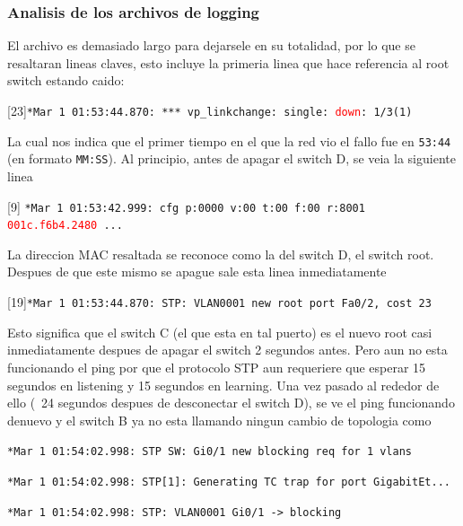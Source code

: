 \subsubsection*{Analisis de los archivos de logging}
El archivo es demasiado largo para dejarsele en su totalidad, por lo que se resaltaran
lineas claves, esto incluye la primeria linea que hace referencia al root switch
estando caido:
\begin{center}
  [23]\texttt{*Mar  1 01:53:44.870: *** vp\_linkchange: single: \textcolor{red}{down}: 1/3(1) }
\end{center}
La cual nos indica que el primer tiempo en el que la red vio el fallo fue en
\texttt{53:44} (en formato \texttt{MM:SS}). Al principio, antes de apagar el switch D,
se veia la siguiente linea
\begin{center}
  [9] \texttt{*Mar  1 01:53:42.999:     cfg p:0000 v:00 t:00 f:00 r:8001 \textcolor{red}{001c.f6b4.2480} ...}
\end{center}
La direccion MAC resaltada se reconoce como la del switch D, el switch root. Despues de
que este mismo se apague sale esta linea inmediatamente
\begin{center}
  [19]\texttt{*Mar  1 01:53:44.870: STP: VLAN0001 new root port Fa0/2, cost 23}
\end{center}
Esto significa que el switch C (el que esta en tal puerto) es el nuevo root casi
inmediatamente despues de apagar el switch 2 segundos antes. Pero aun no esta
funcionando el ping por que el protocolo STP aun requeriere que esperar 15 segundos en
listening y 15 segundos en learning. Una vez pasado al rededor de ello (~24 segundos
despues de desconectar el switch D), se ve el ping funcionando denuevo y el switch B ya
no esta llamando ningun cambio de topologia como 

\noindent[277]\texttt{*Mar  1 01:54:02.998: STP SW: Gi0/1 new blocking req for 1 vlans}

\noindent[278]\texttt{*Mar  1 01:54:02.998: STP[1]: Generating TC trap for port GigabitEt...}

\noindent[279]\texttt{*Mar  1 01:54:02.998: STP: VLAN0001 Gi0/1 -> blocking}
